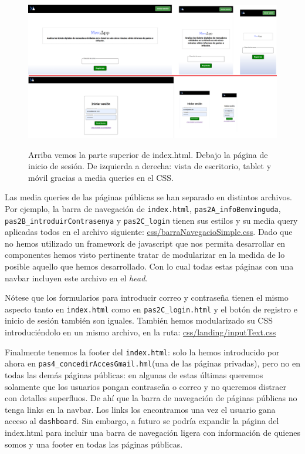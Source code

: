 \documentclass[a4paper,12pt]{report}
\begin{document}
	\FloatBarrier
	\setlength{\belowcaptionskip}{3pt}
	\begin{figure}[H]
		\centering
		\caption{Arriba vemos la parte superior de index.html. Debajo la página de inicio de sesión. De izquierda a derecha: vista de escritorio, tablet y móvil gracias a media queries en el CSS.}
		\includegraphics[width=1\linewidth]{img/mediaQueryIndexhtml}
		\label{fig:mediaQueryIndexhtml}
	\end{figure}
	\FloatBarrier
	
	Las media queries de las páginas públicas se han separado en distintos archivos. Por ejemplo, la barra de navegación de \texttt{index.html}, \texttt{pas2A\_infoBenvinguda}, \texttt{pas2B\_introduirContrasenya} y \texttt{pas2C\_login} tienen sus estilos y su media query aplicadas todos en el archivo siguiente: \href{https://github.com/blackcub3s/mercApp/blob/main/APP%20WEB/__frontend__produccio__/app/css/barraNavegacioSimple.css}{css/barraNavegacioSimple.css}. Dado que no hemos utilizado un framework de javascript que nos permita desarrollar en componentes hemos visto pertinente tratar de modularizar en la medida de lo posible aquello que hemos desarrollado. Con lo cual todas estas páginas con una navbar incluyen este archivo en el \textit{head}.
	
	Nótese que los formularios para introducir correo y contraseña tienen el mismo aspecto tanto en \texttt{index.html} como en \texttt{pas2C\_login.html} y el botón de registro e inicio de sesión también son iguales. También hemos modularizado su CSS introduciéndolo en un mismo archivo, en la ruta: \href{https://github.com/blackcub3s/mercApp/blob/main/APP%20WEB/__frontend__produccio__/app/css/landing/inputText.css}{css/landing/inputText.css}
	
	Finalmente tenemos la footer del \texttt{index.html}: solo la hemos introducido por ahora en \texttt{pas4\_concedirAccesGmail.hml}(una de las páginas privadas), pero no en todas las demás páginas públicas: en algunas de estas últimas queremos solamente que los usuarios pongan contraseña o correo y no queremos distraer con detalles superfluos. De ahí que la barra de navegación de páginas públicas no tenga links en la navbar. Los links los encontramos una vez el usuario gana acceso al \texttt{dashboard}. Sin embargo, a futuro se podría expandir la página del index.html para incluir una barra de navegación ligera con información de quienes somos y una footer en todas las páginas públicas.
	
\end{document}
